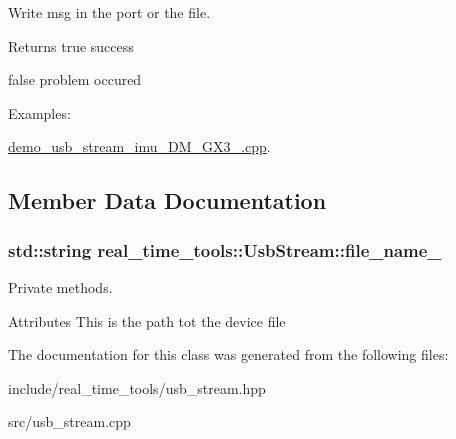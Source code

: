 Write msg in the port or the file. 

\begin{DoxyReturn}{Returns}
true success 

false problem occured 
\end{DoxyReturn}
\begin{Desc}
\item[Examples\+: ]\par
\hyperlink{demo_usb_stream_imu_3DM_GX3_25_8cpp-example}{demo\+\_\+usb\+\_\+stream\+\_\+imu\+\_\+D\+M\+\_\+\+G\+X3\+\_.\+cpp}.\end{Desc}


\subsection{Member Data Documentation}
\subsubsection[{\texorpdfstring{file\+\_\+name\+\_\+}{file_name_}}]{\setlength{\rightskip}{0pt plus 5cm}std\+::string real\+\_\+time\+\_\+tools\+::\+Usb\+Stream\+::file\+\_\+name\+\_\+\hspace{0.3cm}{\ttfamily [private]}}\hypertarget{classreal__time__tools_1_1UsbStream_ac8d1e2727668e9549dda2038248943d5}{}\label{classreal__time__tools_1_1UsbStream_ac8d1e2727668e9549dda2038248943d5}


Private methods. 

Attributes This is the path tot the device file 

The documentation for this class was generated from the following files\+:\begin{DoxyCompactItemize}
\item 
include/real\+\_\+time\+\_\+tools/usb\+\_\+stream.\+hpp\item 
src/usb\+\_\+stream.\+cpp\end{DoxyCompactItemize}
